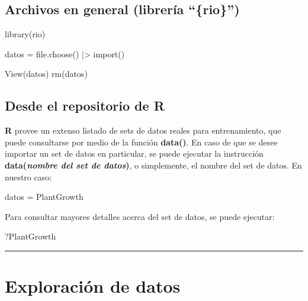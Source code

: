 \documentclass[
  spanish,
  letterpaper,
  DIV=11,
  numbers=noendperiod]{scrreprt}
\newenvironment{Shaded}{\begin{snugshade}}{\end{snugshade}}
\newcommand{\FunctionTok}[1]{\textcolor[rgb]{0.28,0.35,0.67}{#1}}
\newcommand{\NormalTok}[1]{\textcolor[rgb]{0.00,0.23,0.31}{#1}}
\newcommand{\OtherTok}[1]{\textcolor[rgb]{0.00,0.23,0.31}{#1}}
\newcommand{\SpecialCharTok}[1]{\textcolor[rgb]{0.37,0.37,0.37}{#1}}
\begin{document}
\subsection{Archivos en general (librería
``\{rio\}'')}\label{archivos-en-general-libreruxeda-rio}

\begin{Shaded}
\begin{Highlighting}[]

\FunctionTok{library}\NormalTok{(rio)}

\NormalTok{datos }\OtherTok{=} \FunctionTok{file.choose}\NormalTok{() }\SpecialCharTok{|\textgreater{}}
  \FunctionTok{import}\NormalTok{()}

\FunctionTok{View}\NormalTok{(datos)}
\FunctionTok{rm}\NormalTok{(datos)}
\end{Highlighting}
\end{Shaded}

\subsection{\texorpdfstring{Desde el repositorio de
\textbf{R}}{Desde el repositorio de R}}\label{desde-el-repositorio-de-r}

\textbf{R} provee un extenso listado de sets de datos reales para
entrenamiento, que puede consultarse por medio de la función
\textbf{data()}. En caso de que se desee importar un set de datos en
particular, se puede ejecutar la instrucción \textbf{data(\emph{nombre
del set de datos})}, o simplemente, el nombre del set de datos. En
nuestro caso:

\begin{Shaded}
\begin{Highlighting}[]
\NormalTok{datos }\OtherTok{=}\NormalTok{ PlantGrowth}
\end{Highlighting}
\end{Shaded}

Para consultar mayores detalles acerca del set de datos, se puede
ejecutar:

\begin{Shaded}
\begin{Highlighting}[]
\NormalTok{?PlantGrowth}
\end{Highlighting}
\end{Shaded}

\begin{center}\rule{0.5\linewidth}{0.5pt}\end{center}

\section{Exploración de datos}\label{exploraciuxf3n-de-datos}
\end{document}

